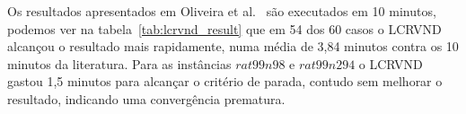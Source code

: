 Os resultados apresentados em Oliveira et al.~\cite{Oliveira:2015} são executados em 10 minutos, podemos ver na tabela~\ref{tab:lcrvnd_result} que em 54 dos 60 casos o LCRVND alcançou o resultado mais rapidamente, numa média de 3,84 minutos contra os 10 minutos da literatura.
Para as instâncias $rat99n98$ e $rat99n294$ o LCRVND gastou 1,5 minutos para alcançar o critério de parada, contudo sem melhorar o resultado, indicando uma convergência prematura.

%